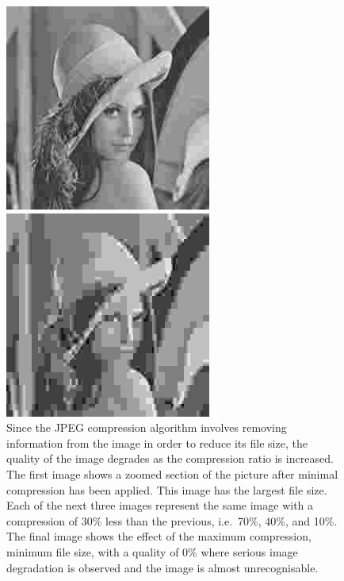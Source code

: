 \begin{figure}[ht]
\begin{minipage}[c]{0.19\linewidth}
			\end{minipage}
			\begin{minipage}[c]{0.19\linewidth}
				\centering
			 	\includegraphics[trim = 20mm 30mm 40mm 30mm, clip]{lena256x256_10.jpg}
			\end{minipage}
			\begin{minipage}[c]{0.19\linewidth}
				\centering
			 	\includegraphics[trim = 20mm 30mm 40mm 30mm, clip]{lena256x256_00.jpg}
			\end{minipage}
			\caption{Since the JPEG compression algorithm involves removing information from the image in order to reduce its file size, the quality of the image degrades as the compression ratio is increased. The first image shows a zoomed section of the picture after minimal compression has been applied. This image has the largest file size. Each of the next three images represent the same image with a compression of 30\% less than the previous, i.e.\ 70\%, 40\%, and 10\%. The final image shows the effect of the maximum compression, minimum file size, with a quality of 0\% where serious image degradation is observed and the image is almost unrecognisable.\label{fig:various_lena}}
		\end{figure}

